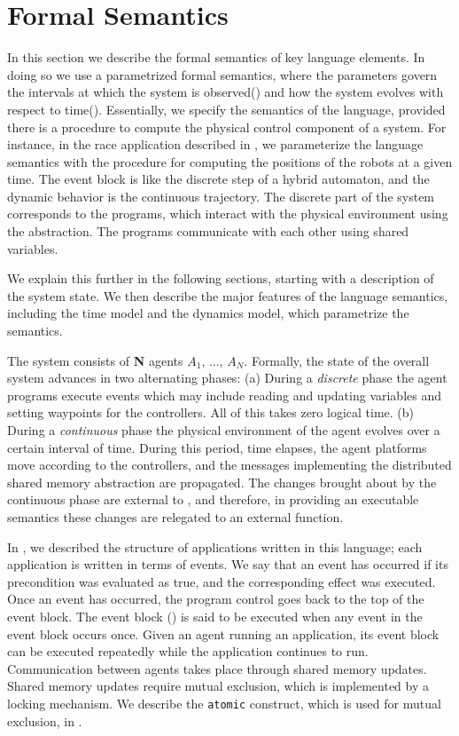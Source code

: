 \section[h]{Formal Semantics}
\label{sect:semantics}

In this section we describe the formal semantics of key language elements. 
In doing so we use a parametrized formal semantics, where the parameters govern the intervals at which the system is observed() and how the system evolves with respect to time(). Essentially, we specify the semantics of the language, provided there is a procedure to compute the physical control component of a system. For instance, in the race application described in , we parameterize the language semantics with the procedure for computing the positions of the robots at a given time. The event block is like the discrete step of a hybrid automaton, and the dynamic behavior is the continuous trajectory\cite{hioa}. The discrete part of the system corresponds to the programs, which interact with the physical environment using the  abstraction. The programs communicate with each other using shared variables.

We explain this further in the following sections, starting with a description of the system state. We then describe the major features of the language semantics, including the time model and the dynamics model, which parametrize the semantics. 
 
The system consists of \textbf{N} agents $A_1$, ..., $A_N$.  Formally, the state of the overall system advances in two alternating phases: 
(a) During a {\em discrete\/} phase the agent programs execute events which may include reading and updating variables and setting waypoints for the controllers. All of this takes zero logical time.
(b) During a {\em continuous\/} phase the physical environment of the agent evolves over a certain interval of time. During this period, time elapses, the agent platforms move according to the controllers, and the messages implementing the distributed shared memory abstraction are propagated. The changes brought about by the continuous phase are external to \rolang, and therefore, in providing an executable semantics these changes are relegated to an external  function.
 
 


In , we described the structure of applications written in this language; each application is written in terms of events. We say that an event has occurred if its precondition was evaluated as true, and the corresponding effect was executed. Once an event has occurred, the program control goes back to the top of the event block. The event block () is said to be executed when any event in the event block occurs once. Given an agent running an application, its event block can be executed repeatedly while the application continues to run. Communication between agents takes place through shared memory updates. Shared memory updates require mutual exclusion, which is implemented by a locking mechanism. We describe the \verb|atomic| construct, which is used for mutual exclusion, in .


